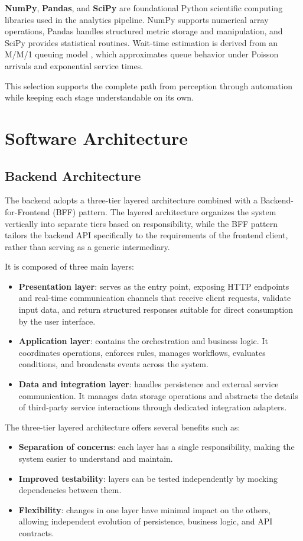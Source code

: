 \textbf{NumPy}, \textbf{Pandas}, and \textbf{SciPy} \cite{numpy_docs,pandas_docs,scipy_docs} are foundational Python scientific computing libraries used in the analytics pipeline. NumPy supports numerical array operations, Pandas handles structured metric storage and manipulation, and SciPy provides statistical routines. Wait-time estimation is derived from an M/M/1 queuing model \cite{gross_queueing}, which approximates queue behavior under Poisson arrivals and exponential service times.

This selection supports the complete path from perception through automation while keeping each stage understandable on its own.
\section{Software Architecture}


\subsection{Backend Architecture}
The backend adopts a three-tier layered architecture combined with a Backend-for-Frontend (BFF) pattern. The layered architecture organizes the system vertically into separate tiers based on responsibility, while the BFF pattern tailors the backend API specifically to the requirements of the frontend client, rather than serving as a generic intermediary.

It is composed of three main layers:
\begin{itemize}
    \item \textbf{Presentation layer}: serves as the entry point, exposing HTTP endpoints and real-time communication channels that receive client requests, validate input data, and return structured responses suitable for direct consumption by the user interface.
    \item \textbf{Application layer}: contains the orchestration and business logic. It coordinates operations, enforces rules, manages workflows, evaluates conditions, and broadcasts events across the system.
    \item \textbf{Data and integration layer}: handles persistence and external service communication. It manages data storage operations and abstracts the details of third-party service interactions through dedicated integration adapters.
\end{itemize}

The three-tier layered architecture offers several benefits such as:
\begin{itemize}
    \item \textbf{Separation of concerns}: each layer has a single responsibility, making the system easier to understand and maintain.
    \item \textbf{Improved testability}: layers can be tested independently by mocking dependencies between them.
    \item \textbf{Flexibility}: changes in one layer have minimal impact on the others, allowing independent evolution of persistence, business logic, and API contracts.
\end{itemize}

